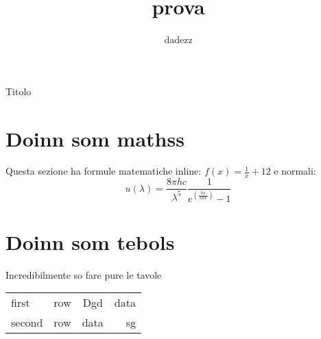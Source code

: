 \documentclass{book}
\author{dadezz}
\title{prova}
\begin{document}
	\maketitle Titolo
	\section{Doinn som mathss}
		Questa sezione ha formule matematiche inline: $f(x)  = \frac{1}{x} + 12$ e normali: \[u(\lambda) = \frac{8\pi hc}{\lambda^5} \frac{1}{e^{(\frac{hc}{\lambda kT})}-1}\]
	\section{Doinn som tebols}
		Incredibilmente so fare pure le tavole
		\begin{table}[!th]
			\begin{tabular}{|l|c|c|r|}
				\hline
				first & row & Dgd & data \\
				second & row & data & sg \\
				\hline
			\end{tabular}
			
		\end{table}
\end{document}
